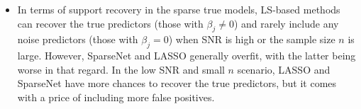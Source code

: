 \begin{itemize}
	\item In terms of support recovery in the sparse true models, LS-based methods can recover the true predictors (those with $\beta_j \ne 0$) and rarely include any noise predictors (those with $\beta_j = 0$) when SNR is high or the sample size $n$ is large. However, SparseNet and LASSO generally overfit, with the latter being worse in that regard. In the low SNR and small $n$ scenario, LASSO and SparseNet have more chances to recover the true predictors, but it comes with a price of including more false positives. 

\end{itemize}



